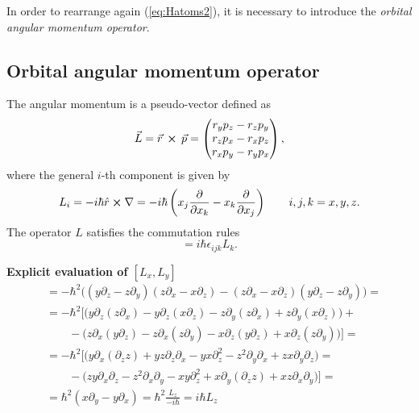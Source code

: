 In order to rearrange again (\ref{eq:Hatoms2}), it is necessary to introduce the \textit{orbital angular momentum operator}. 

\subsection{Orbital angular momentum operator}

The angular momentum is a pseudo-vector defined as
\begin{equation}
    \Vec{L} = \Vec{r} \, \cross \, \Vec{p} = \begin{pmatrix}
        r_yp_z - r_zp_y \\
        r_zp_x - r_xp_z \\
        r_xp_y - r_yp_x \\
    \end{pmatrix},
    \label{eq:Ldef}
\end{equation}
where the general $i$-th component is given by 
\begin{align}
    L_i = -i\hbar \hat{r}\cross \nabla = -i \hbar \left(x_j \frac{\partial}{\partial x_k} - x_k \frac{\partial}{\partial x_j}\right) \qquad i,j,k = x,y,z.
    \label{eq:Li}
\end{align}
The operator $L$ satisfies the commutation rules
\begin{equation}
    [L_i,L_j]=i \hbar \epsilon_{ijk} L_k. 
    \label{eq:commu1}
\end{equation}

\begin{tcolorbox} 
\textbf{Explicit evaluation of $[L_x,L_y]$} 
\begin{align*}
    [L_x,L_y] &= -\hbar^2\bigl((y\partial_z - z \partial_y)(z \partial_x - x \partial_z) - (z \partial_x - x \partial_z)(y \partial_z - z \partial_y)\bigl) = \\
     &= -\hbar^2\bigl[\bigl(y\partial_z(z \partial_x) - y \partial_z (x \partial_z) - 
    z \partial_y (z \partial_x) + z \partial_y (x \partial_z) \bigl) + \\
    & \qquad -\bigl(z \partial_x (y \partial_z) - z \partial_x (z \partial_y) - x \partial_z (y \partial_z ) + x \partial_z (z \partial_y)\bigl) \bigl] =  \\
    &= -\hbar^2\bigl[\bigl(y \partial_x (\partial_z z) + yz \partial_z \partial_x - yx \partial^2_z - z^2 \partial_y \partial_x + zx \partial_y \partial_z \bigl) = \\
    & \qquad - \bigl(zy \partial_x \partial_z - z^2 \partial_x \partial_y - xy \partial_z^2 + x \partial_y (\partial_z z) + xz \partial_x \partial_y \bigl) \bigl] = \\
    &= \hbar^2 ( x \partial_y - y \partial_x ) = \hbar^2 \frac{L_z}{-i\hbar} =  i\hbar L_z
\end{align*}
\end{tcolorbox}

